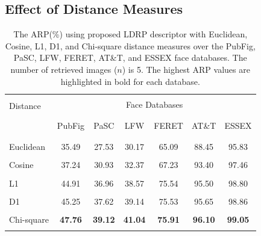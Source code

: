 \documentclass[a4paper]{article}
\begin{document}
\subsection{Effect of Distance Measures}

\begin{table}[!t]
\caption{The ARP(\%) using proposed LDRP descriptor with Euclidean, Cosine, L1, D1, and Chi-square distance measures over the PubFig, PaSC, LFW, FERET, AT\&T, and ESSEX face databases. The number of retrieved images ($n$) is 5. The highest ARP values are highlighted in bold for each database.}
\label{t2}
\begin{center}
\begin{tabular}{lcccccc}
\hline
\\[-0.65em]\multirow{2}{*}{Distance} & \multicolumn{6}{c}{Face Databases}\\ \\[-0.65em]
\cline{2-7} 
\\[-0.65em] & PubFig & PaSC & LFW & FERET & AT\&T & ESSEX \\ \\[-0.65em]
\hline
\\[-0.65em]
Euclidean & 35.49 & 27.53 & 30.17 & 65.09 & 88.45 & 95.83\\ \\[-0.85em]
Cosine & 37.24 & 30.93 & 32.37 & 67.23 & 93.40 & 97.46\\ \\[-0.85em]
L1 & 44.91 & 36.96 & 38.57 & 75.54 & 95.50 & 98.80\\ \\[-0.85em]
D1 & 45.25 & 37.62 & 39.14 & 75.53 & 95.65 & 98.86\\ \\[-0.85em]
Chi-square & \textbf{47.76} & \textbf{39.12} & \textbf{41.04} & \textbf{75.91} & \textbf{96.10} & \textbf{99.05}\\ \\[-0.65em]
\hline
\end{tabular}
\end{center}
\end{table}
\end{document}
